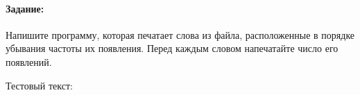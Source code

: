 \paragraph{Задание:}
Напишите программу, которая печатает слова из файла, расположенные в порядке убывания частоты их появления.
Перед каждым словом напечатайте число его появлений.



Тестовый текст:\\






